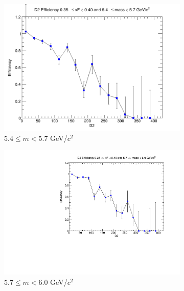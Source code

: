 \documentclass[11pt]{article}
\begin{document}
\begin{figure}[p]
\begin{subfigure}[b]{0.32\textwidth}
        \includegraphics[width=\textwidth]{./kTrackerEfficiencyPlots/D2_Efficiency_xF7_mass4.png}
        \caption{$5.4 \leq m < 5.7$ GeV/$c^2$}
    \end{subfigure}\hfill
    \begin{subfigure}[b]{0.32\textwidth}
        \centering
        \includegraphics[width=\textwidth]{./kTrackerEfficiencyPlots/D2_Efficiency_xF7_mass5.pdf}
        \caption{$5.7 \leq m < 6.0$ GeV/$c^2$}
    \end{subfigure}\vspace{0.5cm}
    \begin{subfigure}[b]{0.32\textwidth}
        \centering

\end{subfigure}
\end{figure}
\end{document}

